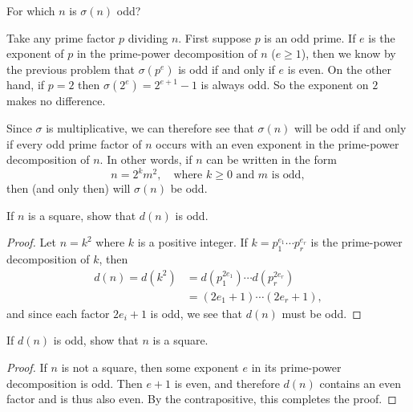  For which $n$ is $\sigma(n)$ odd?
\begin{solution}
  Take any prime factor $p$ dividing $n$. First suppose $p$ is an odd
  prime. If $e$ is the exponent of $p$ in the prime-power
  decomposition of $n$ ($e\geq1$), then we know by the previous
  problem that $\sigma(p^e)$ is odd if and only if $e$ is even. On the
  other hand, if $p = 2$ then $\sigma(2^e) = 2^{e+1} - 1$ is always
  odd. So the exponent on $2$ makes no difference.

  Since $\sigma$ is multiplicative, we can therefore see that
  $\sigma(n)$ will be odd if and only if every odd prime factor of $n$
  occurs with an even exponent in the prime-power decomposition of
  $n$. In other words, if $n$ can be written in the form
  \begin{equation*}
    n = 2^km^2, \quad\text{where $k\geq0$ and $m$ is odd},
  \end{equation*}
  then (and only then) will $\sigma(n)$ be odd.
\end{solution}

 If $n$ is a square, show that $d(n)$ is odd.
\begin{proof}
  Let $n = k^2$ where $k$ is a positive integer. If
  $k = p_1^{e_1}\cdots p_r^{e_r}$ is the prime-power decomposition of
  $k$, then
  \begin{align*}
    d(n) = d(k^2) &= d(p_1^{2e_1})\cdots d(p_r^{2e_r}) \\
                  &= (2e_1 + 1)\cdots(2e_r + 1),
  \end{align*}
  and since each factor $2e_i + 1$ is odd, we see that $d(n)$ must be
  odd.
\end{proof}

 If $d(n)$ is odd, show that $n$ is a square.
\begin{proof}
  If $n$ is not a square, then some exponent $e$ in its prime-power
  decomposition is odd. Then $e + 1$ is even, and therefore $d(n)$
  contains an even factor and is thus also even. By the
  contrapositive, this completes the proof.
\end{proof}

